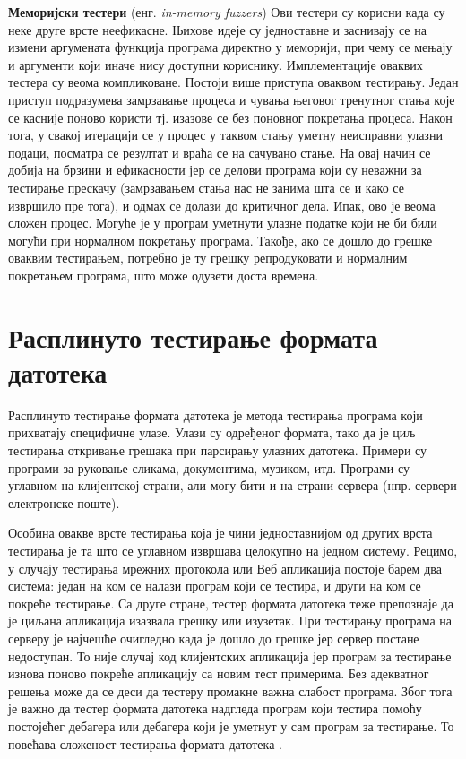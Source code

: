 \documentclass[12pt,oneside]{memoir}
\begin{document}
\begin{description}
\item \textbf{Меморијски тестери} (енг. \textit{in-memory fuzzers}) Ови тестери су корисни када су неке друге врсте неефикасне. Њихове идеје су једноставне и заснивају се на измени аргумената функција програма директно у меморији, при чему се мењају и аргументи који иначе нису доступни кориснику. Имплементације оваквих тестера су веома компликоване. Постоји више приступа оваквом тестирању. Један приступ подразумева замрзавање процеса и чувања његовог тренутног стања које се касније поново користи тј. изазове се без поновног покретања процеса. Након тога, у свакој итерацији се у процес у таквом стању уметну неисправни улазни подаци, посматра се резултат и враћа се на сачувано стање. На овај начин се добија на брзини и ефикасности јер се делови програма који су неважни за тестирање прескачу (замрзавањем стања нас не занима шта се и како се извршило пре тога), и одмах се долази до критичног дела. Ипак, ово је веома сложен процес. Могуће је у програм уметнути улазне податке који не би били могући при нормалном покретању програма. Такође, ако се дошло до грешке оваквим тестирањем, потребно је ту грешку репродуковати и нормалним покретањем програма, што може одузети доста времена.
\end{description}

\section{Расплинуто тестирање формата датотека}
\label{sec:rasTestFormFajl}

Расплинуто тестирање формата датотека  је метода тестирања програма који прихватају специфичне улазе. Улази су одређеног формата, тако да је циљ тестирања откривање грешака при парсирању улазних датотека. Примери су програми за руковање сликама, документима, музиком, итд. Програми су углавном на клијентској страни, али могу бити и на страни сервера (нпр. сервери електронске поште).

Особина овакве врсте тестирања која је чини једноставнијом од других врста тестирања је та што се углавном извршава целокупно на једном систему. Рецимо, у случају тестирања мрежних протокола или Веб апликација постоје барем два система: један на ком се налази програм који се тестира, и други на ком се покреће тестирање. Са друге стране, тестер формата датотека теже препознаје да је циљана апликација изазвала грешку или изузетак. При тестирању програма на серверу је најчешће очигледно када је дошло до грешке јер сервер постане недоступан. То није случај код клијентских апликација јер програм за тестирање изнова поново покреће апликацију са новим тест примерима. Без адекватног решења може да се деси да тестеру промакне важна слабост програма. Због тога је важно да тестер формата датотека надгледа програм који тестира помоћу постојећег дебагера или дебагера који је уметнут у сам програм за тестирање. То повећава сложеност тестирања формата датотека \cite{fuzzingBrute, fuzzing}.
\end{document}
